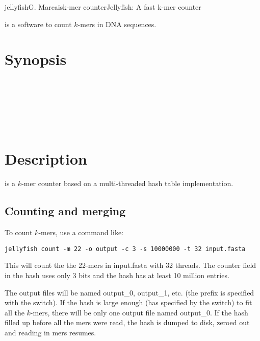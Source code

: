 \documentclass[english]{article}
\newcommand{\ddash}[1]{-\,-#1}
\newcommand{\LoOpt}[1]{\oOpt{\ddash{#1}}}
\begin{document}
\begin{Name}{1}{jellyfish}{G. Marcais}{k-mer counter}{Jellyfish: A fast k-mer counter}

 is a software to count $k$-mers in DNA sequences.

\end{Name}

\section{Synopsis}
     \LoOpt{both-strands}   \\
   \Dots \\
   \\
  \\
     \\
 

\section{Description}

 is a $k$-mer counter based on a multi-threaded hash
table implementation.

\subsection{Counting and merging}

To count $k$-mers, use a command like:

\begin{verbatim}
jellyfish count -m 22 -o output -c 3 -s 10000000 -t 32 input.fasta
\end{verbatim}

This will count the the 22-mers in input.fasta with 32 threads. The
counter field in the hash uses only 3 bits and the hash has at least
10 million entries.

The output files will be named output_0, output_1, etc. (the prefix is
specified with the  switch). If the hash is large enough (has
specified by the  switch) to fit all the $k$-mers, there will
be only one output file named output_0. If the hash filled up before
all the mers were read, the hash is dumped to disk, zeroed out and
reading in mers resumes.
\end{document}
